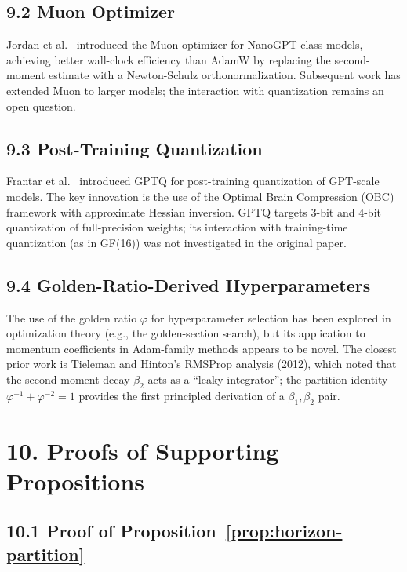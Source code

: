 \subsection{9.2 Muon Optimizer}

Jordan et al.~\cite{jordan_muon_2024} introduced the Muon optimizer
for NanoGPT-class models, achieving better wall-clock efficiency than
AdamW by replacing the second-moment estimate with a Newton-Schulz
orthonormalization.  Subsequent work has extended Muon to larger models;
the interaction with quantization remains an open question.

\subsection{9.3 Post-Training Quantization}

Frantar et al.~\cite{frantar_gptq_2023} introduced GPTQ for
post-training quantization of GPT-scale models.  The key innovation
is the use of the Optimal Brain Compression (OBC) framework with
approximate Hessian inversion.  GPTQ targets 3-bit and 4-bit
quantization of full-precision weights; its interaction with
training-time quantization (as in GF(16)) was not investigated
in the original paper.

\subsection{9.4 Golden-Ratio-Derived Hyperparameters}

The use of the golden ratio \(\varphi\) for hyperparameter selection
has been explored in optimization theory (e.g., the golden-section
search), but its application to momentum coefficients in Adam-family
methods appears to be novel.  The closest prior work is
Tieleman and Hinton's RMSProp analysis (2012), which noted that
the second-moment decay \(\beta_2\) acts as a ``leaky integrator'';
the partition identity
\(\varphi^{-1} + \varphi^{-2} = 1\) provides the first
principled derivation of a \(\beta_1, \beta_2\) pair.

\section{10. Proofs of Supporting Propositions}
\label{sec:28-proofs}

\subsection{10.1 Proof of Proposition~\ref{prop:horizon-partition}}

